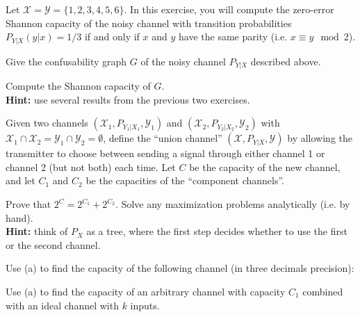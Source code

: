 \documentclass[a4paper,10pt,landscape,twocolumn]{scrartcl}
\begin{document}
\begin{exercise}
Let $\mathcal{X} = \mathcal{Y} = \{1,2,3,4,5,6\}$. In this exercise, you will compute the zero-error Shannon capacity of the noisy channel with transition probabilities $P_{Y|X}(y|x) = 1/3$ if and only if $x$ and $y$ have the same parity (i.e. $x \equiv y \mod 2$).
	\begin{subex}[(2pt)]
	Give the confusability graph $G$ of the noisy channel $P_{Y|X}$ described above.
	\end{subex}
	\begin{subex}[(4pt)]
	Compute the Shannon capacity of $G$.
	\\\textbf{Hint:} use several results from the previous two exercises.
	\end{subex}
\end{exercise}

\begin{exercise}
Given two channels $(\mathcal{X}_1, P_{Y_1|X_1}, \mathcal{Y}_1)$ and $(\mathcal{X}_2, P_{Y_2|X_2}, \mathcal{Y}_2)$ with $\mathcal{X}_1 \cap \mathcal{X}_2 = \mathcal{Y}_1 \cap \mathcal{Y}_2 = \emptyset$, define the ``union channel'' $(\mathcal{X}, P_{Y|X},\mathcal{Y})$ by allowing the transmitter to choose between sending a signal through either channel 1 or channel 2 (but not both) each time. Let $C$ be the capacity of the new channel, and let $C_1$ and $C_2$ be the capacities of the ``component channels''.
\begin{subex}[(4pt)]
Prove that $2^C = 2^{C_1} + 2^{C_2}$. Solve any maximization problems analytically (i.e. by hand).
\\\textbf{Hint:} think of $P_X$ as a tree, where the first step decides whether to use the first or the second channel.
\end{subex}

\begin{subex}[(1pt)]
Use (a) to find the capacity of the following channel (in three decimals precision):
\begin{center}
\end{center}
\end{subex}

\begin{subex}[(1pt)]
Use (a) to find the capacity of an arbitrary channel with capacity $C_1$ combined with an ideal channel with $k$ inputs.
\end{subex}
\end{exercise}
\end{document}
